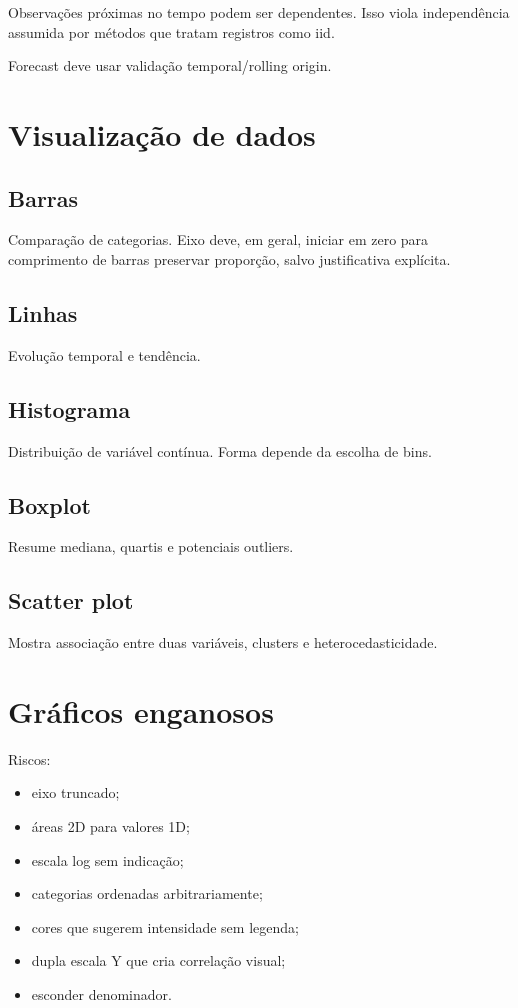 Observações próximas no tempo podem ser dependentes. Isso viola independência assumida por métodos que tratam registros como iid.

Forecast deve usar validação temporal/rolling origin.

\section{Visualização de dados}

\subsection{Barras}

Comparação de categorias. Eixo deve, em geral, iniciar em zero para comprimento de barras preservar proporção, salvo justificativa explícita.

\subsection{Linhas}

Evolução temporal e tendência.

\subsection{Histograma}

Distribuição de variável contínua. Forma depende da escolha de bins.

\subsection{Boxplot}

Resume mediana, quartis e potenciais outliers.

\subsection{Scatter plot}

Mostra associação entre duas variáveis, clusters e heterocedasticidade.

\section{Gráficos enganosos}

Riscos:
\begin{itemize}
\item eixo truncado;
\item áreas 2D para valores 1D;
\item escala log sem indicação;
\item categorias ordenadas arbitrariamente;
\item cores que sugerem intensidade sem legenda;
\item dupla escala Y que cria correlação visual;
\item esconder denominador.
\end{itemize}


